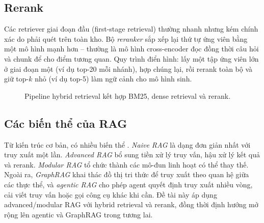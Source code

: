 \subsection{Rerank}

Các retriever giai đoạn đầu (first-stage retrieval) thường nhanh nhưng kém chính xác do
phải quét trên toàn kho. Bộ \emph{reranker} sắp xếp lại thứ tự ứng viên bằng
một mô hình mạnh hơn -- thường là mô hình cross-encoder đọc đồng thời câu hỏi và chunk
để cho điểm tương quan. Quy trình điển hình: lấy một tập ứng viên lớn ở giai đoạn một (ví
dụ top-20 mỗi nhánh), hợp chúng lại, rồi rerank toàn bộ và giữ top-$k$ nhỏ (ví dụ
top-5) làm ngữ cảnh cho mô hình sinh.

\begin{figure}[htbp]
\centering
{}
\caption{Pipeline hybrid retrieval kết hợp BM25, dense retrieval và rerank.}
\label{fig:rag-hybrid}
\end{figure}

\subsection{Các biến thể của RAG}

Từ kiến trúc cơ bản, \rag{} có nhiều biến thể \cite{gao2023ragsurvey}. \emph{Naive RAG} là dạng đơn giản nhất với
truy xuất một lần. \emph{Advanced RAG} bổ sung tiền xử lý truy vấn, hậu xử lý kết quả và
rerank. \emph{Modular RAG} tổ chức thành các mô-đun linh hoạt có thể thay thế. Ngoài
ra, \emph{GraphRAG} khai thác đồ thị tri thức để truy xuất theo quan hệ giữa các thực thể,
và \emph{agentic RAG} cho phép agent quyết định truy xuất nhiều vòng, cải viết truy vấn
hoặc gọi công cụ khác khi cần. Đề tài này áp dụng advanced/modular RAG với hybrid retrieval và
rerank, đồng thời định hướng mở rộng lên agentic và GraphRAG trong tương lai.

